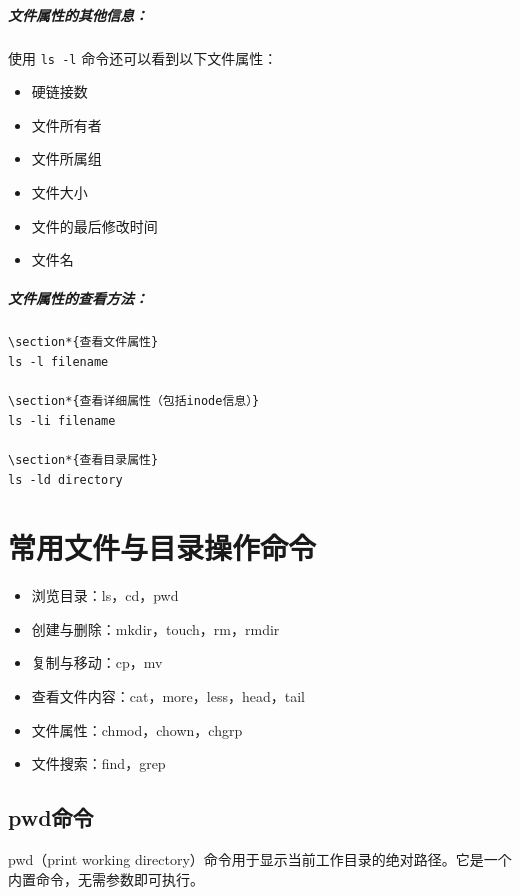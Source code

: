 \documentclass[12pt,UTF8]{ctexbook}
\begin{document}
\subparagraph{文件属性的其他信息：}
使用 \verb+ls -l+ 命令还可以看到以下文件属性：
\begin{itemize}
    \item 硬链接数
    \item 文件所有者
    \item 文件所属组
    \item 文件大小
    \item 文件的最后修改时间
    \item 文件名
\end{itemize}

\subparagraph{文件属性的查看方法：}
\begin{verbatim}
\section*{查看文件属性}
ls -l filename

\section*{查看详细属性（包括inode信息）}
ls -li filename

\section*{查看目录属性}
ls -ld directory
\end{verbatim}

\section{常用文件与目录操作命令}
\begin{itemize}
    \item 浏览目录：ls，cd，pwd
    \item 创建与删除：mkdir，touch，rm，rmdir
    \item 复制与移动：cp，mv
    \item 查看文件内容：cat，more，less，head，tail
    \item 文件属性：chmod，chown，chgrp
    \item 文件搜索：find，grep
\end{itemize}

\subsection{pwd命令}
pwd（print working directory）命令用于显示当前工作目录的绝对路径。它是一个内置命令，无需参数即可执行。
\end{document}
